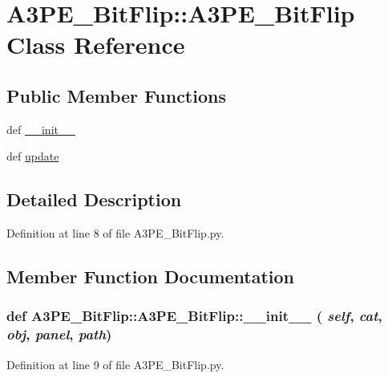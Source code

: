 \hypertarget{classA3PE__BitFlip_1_1A3PE__BitFlip}{
\section{A3PE\_\-BitFlip::A3PE\_\-BitFlip Class Reference}
\label{classA3PE__BitFlip_1_1A3PE__BitFlip}
}
\subsection*{Public Member Functions}
\begin{DoxyCompactItemize}
\item 
def \hyperlink{classA3PE__BitFlip_1_1A3PE__BitFlip_a75f909f45a0a955cca98e0d27ce2dbba}{\_\-\_\-init\_\-\_\-}
\item 
def \hyperlink{classA3PE__BitFlip_1_1A3PE__BitFlip_aa4833495c63cefcb48337cae8ecc171c}{update}
\end{DoxyCompactItemize}


\subsection{Detailed Description}


Definition at line 8 of file A3PE\_\-BitFlip.py.

\subsection{Member Function Documentation}
\hypertarget{classA3PE__BitFlip_1_1A3PE__BitFlip_a75f909f45a0a955cca98e0d27ce2dbba}{
\subsubsection[{\_\-\_\-init\_\-\_\-}]{\setlength{\rightskip}{0pt plus 5cm}def A3PE\_\-BitFlip::A3PE\_\-BitFlip::\_\-\_\-init\_\-\_\- ( {\em self}, \/   {\em cat}, \/   {\em obj}, \/   {\em panel}, \/   {\em path})}}
\label{classA3PE__BitFlip_1_1A3PE__BitFlip_a75f909f45a0a955cca98e0d27ce2dbba}


Definition at line 9 of file A3PE\_\-BitFlip.py.


